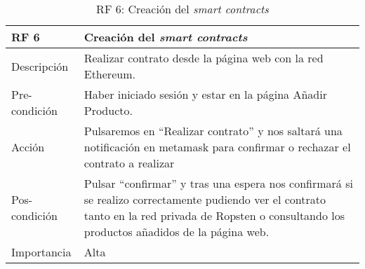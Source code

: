 \begin{table}[htbp]
\begin{center}
\begin{tabular}{|l|p{10cm}|}
\hline
\textbf{RF 6} & \textbf{Creación del \textit{smart contracts}}                                                                                                                                                            \\ \hline
Descripción   & Realizar contrato desde la página web con la red Ethereum.                                                                                                                                      \\ \hline
Pre-condición   & Haber iniciado sesión y estar en la página Añadir Producto.                                                                                                                                     \\ \hline
Acción        & Pulsaremos en ``Realizar contrato'' y nos saltará una notificación en metamask para confirmar o rechazar el contrato a realizar                                                                    \\ \hline
Pos-condición & Pulsar ``confirmar'' y tras una espera nos confirmará si se realizo correctamente pudiendo ver el contrato tanto en la red privada de Ropsten o consultando los productos añadidos de la página web. \\ \hline
Importancia   & Alta                                                                                                                                                                                            \\ \hline
\end{tabular}
\caption{RF 6: Creación del \textit{smart contracts}}
	\label{tabla:tablaB6}
	\end{center}
\end{table}

